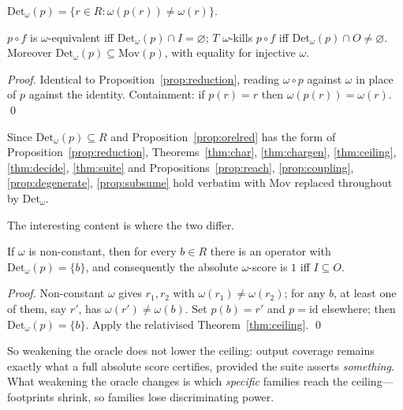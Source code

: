 \documentclass[runningheads,envcountsect,envcountsame]{llncs}
\newcommand{\Mov}{\mathrm{Mov}}
\newcommand{\DetW}{\mathrm{Det}_{\omega}}
\begin{document}
\begin{definition}
\label{def:detw}
$\DetW(p) = \{ r \in R : \omega(p(r)) \neq \omega(r) \}$.
\end{definition}

\begin{proposition}
\label{prop:orelred}
$p \circ f$ is $\omega$-equivalent iff $\DetW(p) \cap I = \varnothing$; $T$
$\omega$-kills $p \circ f$ iff $\DetW(p) \cap O \neq \varnothing$. Moreover
$\DetW(p) \subseteq \Mov(p)$, with equality for injective $\omega$.
\end{proposition}

\begin{proof}
Identical to Proposition~\ref{prop:reduction}, reading $\omega \circ p$ against
$\omega$ in place of $p$ against the identity. Containment: if $p(r) = r$ then
$\omega(p(r)) = \omega(r)$. \qed
\end{proof}

\begin{corollary}
\label{cor:relativise}
Since $\DetW(p) \subseteq R$ and Proposition~\ref{prop:orelred} has the form of
Proposition~\ref{prop:reduction}, Theorems~\ref{thm:char}, \ref{thm:chargen},
\ref{thm:ceiling}, \ref{thm:decide}, \ref{thm:suite} and
Propositions~\ref{prop:reach}, \ref{prop:coupling}, \ref{prop:degenerate},
\ref{prop:subsume} hold verbatim with $\Mov$ replaced throughout by $\DetW$.
\end{corollary}

The interesting content is where the two differ.

\begin{proposition}
\label{prop:oceiling}
If $\omega$ is non-constant, then for every $b \in R$ there is an operator with
$\DetW(p) = \{b\}$, and consequently the absolute $\omega$-score is $1$ iff
$I \subseteq O$.
\end{proposition}

\begin{proof}
Non-constant $\omega$ gives $r_1, r_2$ with $\omega(r_1) \neq \omega(r_2)$; for
any $b$, at least one of them, say $r'$, has $\omega(r') \neq \omega(b)$. Set
$p(b) = r'$ and $p = \mathrm{id}$ elsewhere; then $\DetW(p) = \{b\}$. Apply the
relativised Theorem~\ref{thm:ceiling}. \qed
\end{proof}

So weakening the oracle does not lower the ceiling: output coverage remains
exactly what a full absolute score certifies, provided the suite asserts
\emph{something}. What weakening the oracle changes is which \emph{specific}
families reach the ceiling---footprints shrink, so families lose discriminating
power.
\end{document}
